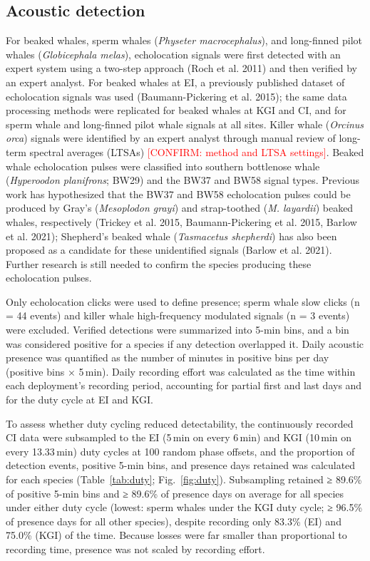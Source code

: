 \documentclass[11pt]{article}
\newcommand{\conf}[1]{\textcolor{red}{[CONFIRM: #1]}}
\newcommand{\unit}[1]{\,#1}
\begin{document}
\subsection{Acoustic detection}
For beaked whales, sperm whales (\textit{Physeter macrocephalus}), and long-finned pilot whales (\textit{Globicephala melas}), echolocation signals were first detected with an expert system using a two-step approach (Roch et al. 2011) and then verified by an expert analyst. For beaked whales at EI, a previously published dataset of echolocation signals was used (Baumann-Pickering et al. 2015); the same data processing methods were replicated for beaked whales at KGI and CI, and for sperm whale and long-finned pilot whale signals at all sites. Killer whale (\textit{Orcinus orca}) signals were identified by an expert analyst through manual review of long-term spectral averages (LTSAs) \conf{method and LTSA settings}. Beaked whale echolocation pulses were classified into southern bottlenose whale (\textit{Hyperoodon planifrons}; BW29) and the BW37 and BW58 signal types. Previous work has hypothesized that the BW37 and BW58 echolocation pulses could be produced by Gray's (\textit{Mesoplodon grayi}) and strap-toothed (\textit{M. layardii}) beaked whales, respectively (Trickey et al. 2015, Baumann-Pickering et al. 2015, Barlow et al. 2021); Shepherd's beaked whale (\textit{Tasmacetus shepherdi}) has also been proposed as a candidate for these unidentified signals (Barlow et al. 2021). Further research is still needed to confirm the species producing these echolocation pulses.

Only echolocation clicks were used to define presence; sperm whale slow clicks (n = 44 events) and killer whale high-frequency modulated signals (n = 3 events) were excluded. Verified detections were summarized into 5-min bins, and a bin was considered positive for a species if any detection overlapped it. Daily acoustic presence was quantified as the number of minutes in positive bins per day (positive bins × 5\unit{min}). Daily recording effort was calculated as the time within each deployment's recording period, accounting for partial first and last days and for the duty cycle at EI and KGI.

To assess whether duty cycling reduced detectability, the continuously recorded CI data were subsampled to the EI (5\unit{min} on every 6\unit{min}) and KGI (10\unit{min} on every 13.33\unit{min}) duty cycles at 100 random phase offsets, and the proportion of detection events, positive 5-min bins, and presence days retained was calculated for each species (Table~\ref{tab:duty}; Fig.~\ref{fig:duty}). Subsampling retained ≥ 89.6\% of positive 5-min bins and ≥ 89.6\% of presence days on average for all species under either duty cycle (lowest: sperm whales under the KGI duty cycle; ≥ 96.5\% of presence days for all other species), despite recording only 83.3\% (EI) and 75.0\% (KGI) of the time. Because losses were far smaller than proportional to recording time, presence was not scaled by recording effort.
\end{document}
